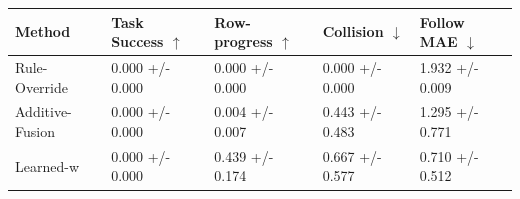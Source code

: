 \begin{tabular}{lllll}
\toprule
Method & Task Success $\uparrow$ & Row-progress $\uparrow$ & Collision $\downarrow$ & Follow MAE $\downarrow$ \\
\midrule
Rule-Override & 0.000 +/- 0.000 & 0.000 +/- 0.000 & 0.000 +/- 0.000 & 1.932 +/- 0.009 \\
Additive-Fusion & 0.000 +/- 0.000 & 0.004 +/- 0.007 & 0.443 +/- 0.483 & 1.295 +/- 0.771 \\
Learned-w & 0.000 +/- 0.000 & 0.439 +/- 0.174 & 0.667 +/- 0.577 & 0.710 +/- 0.512 \\
\bottomrule
\end{tabular}
